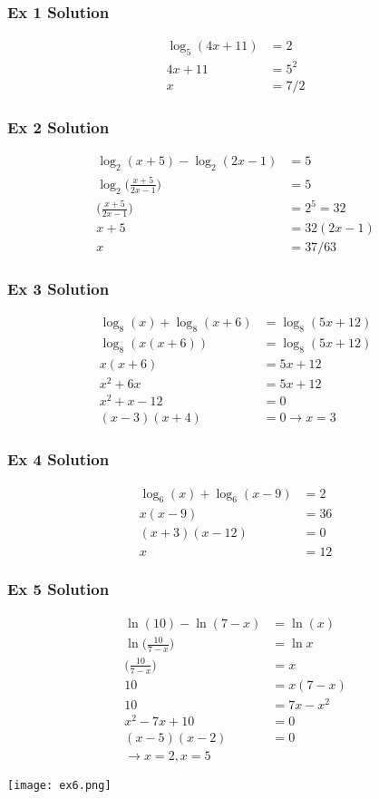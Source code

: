 \documentclass[xcolor=dvipsnames, 9pt]{beamer} %
\begin{document}
\begin{frame}
\frametitle{Ex 1 Solution}
\begin{align*}
\log_5(4x+11) &= 2 \\
4x + 11 &= 5^2 \\
x &= 7/2 
\end{align*}
\end{frame}

\begin{frame}
\frametitle{Ex 2 Solution}
\begin{align*}
\log_2(x+5) - \log_2(2x-1) &= 5 \\
\log_2 \bigg( \frac{x+5}{2x-1} \bigg) &= 5 \\
\bigg( \frac{x+5}{2x-1} \bigg) &= 2^5 = 32 \\
x + 5 &= 32(2x-1) \\
x &= 37/63
\end{align*}
\end{frame}

\begin{frame}
\frametitle{Ex 3 Solution}
\begin{align*}
\log_8(x) + \log_8(x+6) &= \log_8(5x+12) \\
\log_8(x(x+6)) &= \log_8 (5x + 12) \\
x(x+6) &= 5x+12 \\
x^2 + 6x &= 5x + 12 \\
x^2 + x - 12 &= 0 \\
(x - 3)(x +4) &= 0 \rightarrow x = 3
\end{align*}
\end{frame}

\begin{frame}
\frametitle{Ex 4 Solution}
\begin{align*}
\log_6(x) + \log_6(x - 9) &= 2 \\
x(x-9) &= 36 \\
(x +3)(x - 12) &= 0 \\
x &= 12 
\end{align*}
\end{frame}

\begin{frame}
\frametitle{Ex 5 Solution}
\begin{scriptsize}
\begin{align*}
\ln(10) - \ln(7-x) &= \ln(x) \\
\ln \bigg( \frac{10}{7-x} \bigg) &= \ln x \\
\bigg( \frac{10}{7-x} \bigg) &= x \\
10 &= x(7-x) \\
10 &= 7x - x^2 \\
x^2 - 7x + 10 &= 0 \\
(x - 5)(x-2) &= 0\\ 
\rightarrow x = 2, x = 5
\end{align*}
\end{scriptsize}
\begin{center}
\texttt{[image: ex6.png]}
\end{center}
\end{frame}
\end{document}
